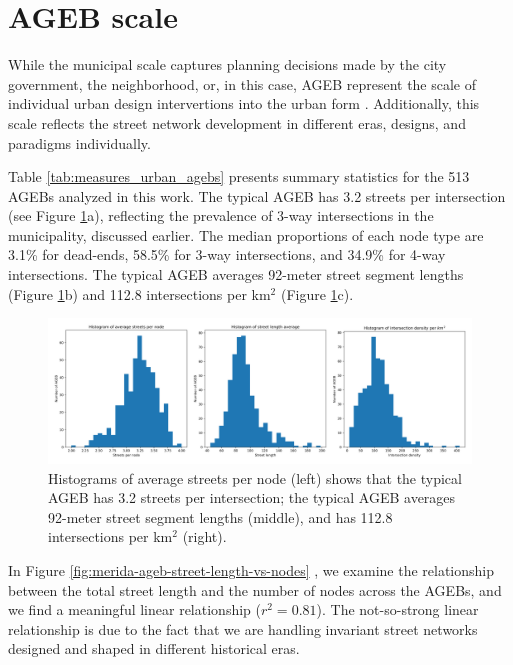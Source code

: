 \section{AGEB scale}
\label{sec:ageb-scale}

While the municipal scale captures planning decisions made by the city government, the neighborhood, or, in this case, AGEB represent the scale of individual urban design intervertions into the urban form \cite{boeing_multi-scale_2018}. Additionally, this scale reflects the street network development in different eras, designs, and paradigms individually.

Table \ref{tab:measures_urban_agebs} presents summary statistics for the 513 AGEBs analyzed in this work. The typical AGEB has 3.2 streets per intersection (see Figure \ref{fig:merida-ageb-histograms}a), reflecting the prevalence of 3-way intersections in the municipality, discussed earlier. The median proportions of each node type are 3.1\% for dead-ends, 58.5\% for 3-way intersections, and 34.9\% for 4-way intersections. The typical AGEB averages 92-meter street segment lengths (Figure \ref{fig:merida-ageb-histograms}b) and 112.8 intersections per km$^2$ (Figure \ref{fig:merida-ageb-histograms}c).

\begin{figure}[htpb]
  \centering
  \includegraphics[width=\textwidth]{Figures/merida-ageb-histograms.png}
  \caption{Histograms of average streets per node (left) shows that the typical AGEB has 3.2 streets per intersection; the typical AGEB averages 92-meter street segment lengths (middle), and has 112.8 intersections per km$^2$ (right).
    \label{fig:merida-ageb-histograms}}
\end{figure}

In Figure \ref{fig:merida-ageb-street-length-vs-nodes} , we examine the relationship between the total street length and the number of nodes across the AGEBs, and we find a meaningful linear relationship ($r^2 = 0.81$). The not-so-strong linear relationship is due to the fact that we are handling invariant street networks designed and shaped in different historical eras.


